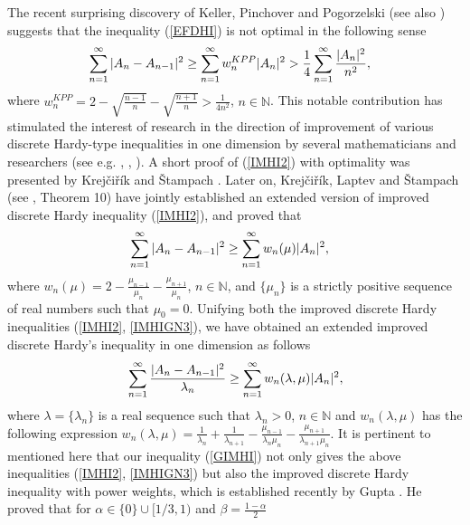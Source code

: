 \documentclass[12pt]{amsart}
\theoremstyle{definition}
\theoremstyle{plain}
\theoremstyle{definition}
\numberwithin{equation}{section}
\begin{document}
The recent surprising discovery of Keller, Pinchover and Pogorzelski \cite{MKR} (see also \cite{MKRGRAPH}) suggests that the inequality (\ref{EFDHI}) is not optimal in the following sense
\begin{align}{\label{IMHI2}}
\displaystyle\sum_{n=1}^{\infty}| A_n-A_{n-1}|^{2}&\geq\displaystyle\sum_{n=1}^{\infty} w_n^{KPP}|A_n|^{2}>\frac{1}{4}\displaystyle
\sum_{n=1}^{\infty} \frac{|A_n|^{2}}{n^{2}},
\end{align}where $w_n^{KPP}=2-\sqrt{\frac{n-1}{n}}-\sqrt{\frac{n+1}{n}}>\frac{1}{4n^2}$, $n\in \mathbb{N}$. This notable contribution has stimulated the interest of research in the direction of improvement of various discrete Hardy-type inequalities in one dimension by several mathematicians and researchers (see e.g. \cite{SGA}, \cite{HUANG21}, \cite{HUANGYE}). A short proof of (\ref{IMHI2}) with optimality was presented by Krej\v{c}i\v{r}\'{i}k and \v{S}tampach \cite{DKK}. Later on, Krej\v{c}i\v{r}\'{i}k, Laptev and \v{S}tampach (see \cite{DKALFS}, Theorem 10) have jointly established an extended version of improved discrete Hardy inequality (\ref{IMHI2}), and proved that
\begin{align}{\label{IMHIGN3}}
\displaystyle\sum_{n=1}^{\infty}| A_n-A_{n-1}|^{2}&\geq \displaystyle\sum_{n=1}^{\infty} w_n(\mu)|A_n|^{2},
\end{align}
where $w_n(\mu)=2-\frac{\mu_{n-1}}{\mu_n}-\frac{\mu_{n+1}}{\mu_n}$, $n\in \mathbb{N}$, and $\{\mu_n\}$ is a strictly positive sequence of real numbers such that $\mu_0=0$. Unifying both the improved discrete Hardy inequalities (\ref{IMHI2}, \ref{IMHIGN3}), we \cite{DASMAN} have obtained an extended improved discrete Hardy's inequality in one dimension as follows
\begin{align}{\label{GIMHI}}
\displaystyle\sum_{n=1}^{\infty}\frac{|A_{n}-A_{n-1}|^{2}}{\lambda_{n}}\geq \displaystyle\sum_{n=1}^{\infty}w_{n}(\lambda, \mu )|A_n|^{2},
\end{align} where $\lambda=\{\lambda_n\}$ is a real sequence such that $\lambda_{n}>0$, $n\in \mathbb{N}$ and $w_{n}(\lambda, \mu)$ has the following expression
$w_{n}(\lambda, \mu) =\frac{1}{\lambda_{n}}+\frac{1}{\lambda_{n+1}}-\frac{\mu_{n-1}}{\lambda_{n}\mu_{n}}-\frac{\mu_{n+1}}{\lambda_{n+1}\mu_{n}}$.
It is pertinent to mentioned here that our inequality (\ref{GIMHI}) not only gives the above inequalities (\ref{IMHI2}, \ref{IMHIGN3}) but also the improved discrete Hardy inequality with power weights, which is established recently by Gupta \cite{SGA}. He proved that for $\alpha\in \{0\}\cup[1/3, 1)$ and $\beta=\frac{1-\alpha}{2}$
\end{document}
